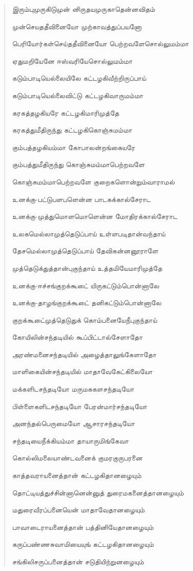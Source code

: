 \documentclass{article}
\begin{document}
\begin{quotation}
{இரும்புமுருகிடுமுன் னிருதயமுருகாதென்னவிதம்

முன்செயததீவினையோ முற்காவத்துப்பயனோ

பெரியோர்கள்‌செய்ததீவினையோ பெற்றவளேசொல்‌லுமம்மா

ஏதுமறியேனே ஈஸ்வரியேசொல்லுமம்மா

கடும்பாடியெல்லையிலே கட்டழகிவீற்றிருப்பாய்

கடும்பாடியெல்லைவிட்டு கட்டழகிவாருமம்மா

கரகத்தழகியரே கட்டழகிமாரிமுத்தே

கரகத்துமீதிருந்து கட்டழகிகொஞ்சுமம்மா

கும்பத்தழகியம்மா கோபாலன்றங்கையரே

கும்பத்துமீதிருந்து கொஞ்சுமம்மாபெற்றவளே

கொஞ்சுமம்மாபெற்றவளே குறைகளொன்றும்வாராமல்

உனக்கு-பட்டுபளபளென்ன பாடகக்கால்சேராட

உனக்கு-முத்துமொளமொளென்ன மோதிரக்கால்சேராட

உலகமெல்லாமுத்தெடுப்பாய் உள்ளபடிதான்வந்தாய்

தேசமெல்லாமுத்தெடுப்பாய் தேவிகன்னனூராளே

முத்தெடுக்துத்தான்புகுந்தாய் உத்தமியேமாரிமுத்தே

உனக்கு-ஈச்சங்குறக்கூடை் யிருகட்டும்பொன்னாலே

உனக்கு-தாழங்குறக்கூடை் தனிகட்டும்பொன்னாலே

குறக்கூடை்முத்தெடுதுக் கொம்பனையேநீபுகுந்தாய்

கோயிலின்சந்தடியில் கூப்பிட்டால்சேளாதோ

அரண்மனைசந்தடியில் அழைத்தாலுங்கேளாதோ

மாளிகையின்சந்தடியில் மாதாவேகேட்கிலையோ

மக்களிடசந்தடியோ மருமககளசந்தடியோ

பிள்ளைகளிடசந்தடியோ பேரன்மார்சந்தடியோ

அனந்தல்பெருமையோ ஆசாரசந்தடியோ

சந்தடியைநீக்கியம்மா தாயாருமிங்கேவா

கொல்லிமலையாண்டவனைக் குமரகுருபரனை

காத்தவராயனைத்தான் கட்டழகிதானழையும்

தொட்டியத்துச்சின்னானென்னுத் துரைமகனைத்தானழையும்

மதுரைவீரப்பனையென் மாதாவேதானழையும்

பாவாடைராயனைத்தான் பத்தினியேதானழையும்

கருப்பண்ணசுவாமியையுங் கட்டழகிதானழையும்

சங்‌கிலிசருப்பனைத்தான்‌ சடுதியிற்றுனழையும்‌

}
\end{quotation}
\end{document}
